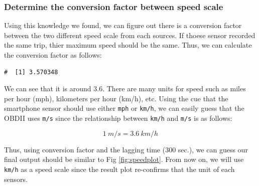 \documentclass[letterpaper,9pt,twocolumn,twoside,]{pinp}
\begin{document}
\hypertarget{determine-the-conversion-factor-between-speed-scale}{%
\subsubsection{Determine the conversion factor between speed
scale}\label{determine-the-conversion-factor-between-speed-scale}}

Using this knowledge we found, we can figure out there is a conversion
factor between the two different speed scale from each sources. If
thoese sensor recorded the same trip, thier maximum speed should be the
same. Thus, we can calculate the conversion factor as follows:

\begin{Shaded}
\begin{Highlighting}[]
\OperatorTok{$}\OperatorTok{/}\StringTok{ }
\StringTok{  }\OperatorTok{$}
\end{Highlighting}
\end{Shaded}

\begin{ShadedResult}
\begin{verbatim}
#  [1] 3.570348
\end{verbatim}
\end{ShadedResult}

We can see that it is around 3.6. There are many units for speed such as
miles per hour (mph), kilometers per hour (km/h), etc. Using the cue
that the smartphone sensor should use either \texttt{mph} or
\texttt{km/h}, we can easily guess that the OBDII uses \texttt{m/s}
since the relationship between \texttt{km/h} and \texttt{m/s} is as
follows:

\[
1 \ m/s = 3.6 \ km/h
\]

Thus, using conversion factor and the lagging time (300 sec.), we can
guess our final output should be similar to Fig \ref{fig:speedplot}.
From now on, we will use \texttt{km/h} as a speed scale since the result
plot re-confirms that the unit of each sensors.
\end{document}
